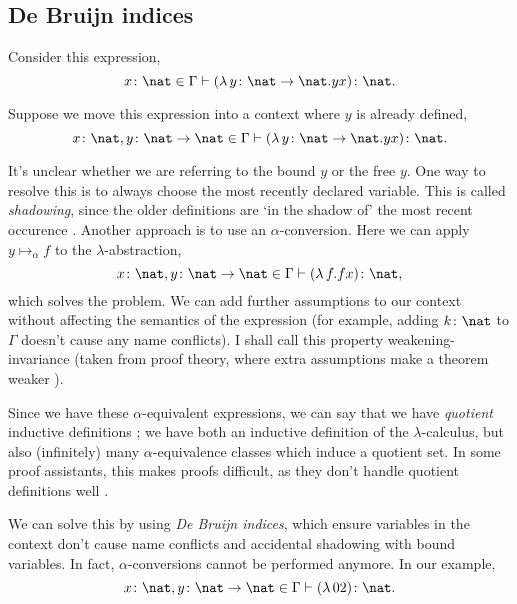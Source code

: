 \subsection{De Bruijn indices}
\label{section:background_debruijn}
Consider this expression,
\begin{equation*}
  x \colon \nat \in \Gamma \vdash (\lambda \, y \colon \nat \to \nat. y x) \colon \nat.
\end{equation*}

Suppose we move this expression into a context where $y$ is already defined,
\begin{equation*}
  x \colon \nat, y \colon \nat \to \nat \in \Gamma \vdash (\lambda \, y \colon \nat \to \nat. y x) \colon \nat.
\end{equation*}

It's unclear whether we are referring to the bound $y$ or the free $y$. One way to resolve this is
to always choose the most recently declared variable. This is called \textit{shadowing}, since the
older definitions are `in the shadow of' the most recent occurence \citep{wadler_programming_2022}.
Another approach is to use an $\alpha$-conversion. Here we can apply $y \mapsto_{\alpha} f$ to the
$\lambda$-abstraction,
\begin{equation*}
  x \colon \nat, y \colon \nat \to \nat \in \Gamma \vdash (\lambda \, f. f x) \colon \nat,
\end{equation*}
which solves the problem. We can add further assumptions to our context without affecting the
semantics of the expression \citep{pitts_locally_2023} (for example, adding $k \colon \nat$ to
$\Gamma$ doesn't cause any name conflicts). I shall call this property weakening-invariance (taken
from proof theory, where extra assumptions make a theorem weaker \citep{buss_handbook_1998}).

Since we have these $\alpha$-equivalent expressions, we can say that we have \textit{quotient}
inductive definitions \citep{aydemir_engineering_2008}; we have both an inductive definition of the
$\lambda$-calculus, but also (infinitely) many $\alpha$-equivalence classes which induce a quotient
set. In some proof assistants, this makes proofs difficult, as they don't handle quotient
definitions well \citep{pitts_locally_2023}.

We can solve this by using \textit{De Bruijn indices}, which ensure variables in the context don't
cause name conflicts and accidental shadowing with bound variables. In fact, $\alpha$-conversions
cannot be performed anymore. In our example,
\begin{equation*}
  x \colon \nat, y \colon \nat \to \nat \in \Gamma \vdash (\lambda \, 0 2) \colon \nat.
\end{equation*}


